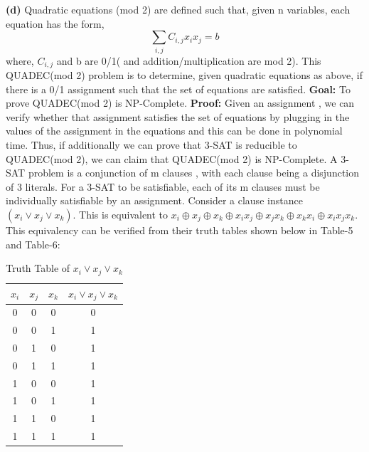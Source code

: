 \documentclass{article}
\renewcommand\part[1]{\vspace{.10in}\textbf{(#1)}}
\begin{document}
\part{d}
Quadratic equations (mod 2) are defined such that, given n variables, each equation has the form, \newline
\[ \sum_{i,j}C_{i,j}x_{i}x_{j} = b \]
where, $C_{i,j}$ and b are 0/1( and addition/multiplication are mod 2). This QUADEC(mod 2) problem is to determine, given quadratic equations as above, if there is a 0/1 assignment such that the set of equations are satisfied. \newline
\textbf {Goal:} To prove QUADEC(mod 2) is NP-Complete. \newline
\textbf{Proof:} Given an assignment , we can verify whether that assignment satisfies the set of equations by plugging in the values of the assignment in the equations and this can be done in polynomial time. Thus, if additionally we can prove that 3-SAT is reducible to QUADEC(mod 2), we can claim that QUADEC(mod 2) is NP-Complete. \newline
A 3-SAT problem is a conjunction of m clauses , with each clause being a disjunction of 3 literals. For a 3-SAT to be satisfiable, each of its m clauses must be individually satisfiable by an assignment. Consider a clause instance $(x_{i} \vee x_{j} \vee x_{k})$. This is equivalent to $x_{i}\oplus x_{j} \oplus x_{k} \oplus x_{i}x_{j} \oplus x_{j}x_{k} \oplus x_{k}x_{i} \oplus x_{i}x_{j}x_{k}$. This equivalency can be verified from their truth tables shown below in Table-5 and Table-6: \newline


\begin{table}[ht]
  \caption{Truth Table of $x_{i} \vee x_{j} \vee x_{k}$}
  \centering
  \begin{tabular}{c c c c}
  \hline\hline
  $x_{i}$ & $x_{j}$ & $x_{k}$ & $x_{i} \vee x_{j} \vee x_{k}$ \\[0.5ex]
  \hline
  0 & 0 & 0 & 0 \\
  0 & 0 & 1 & 1 \\
  0 & 1 & 0 & 1 \\
  0 & 1 & 1 & 1 \\
  1 & 0 & 0 & 1 \\
  1 & 0 & 1 & 1 \\
  1 & 1 & 0 & 1 \\
  1 & 1 & 1 & 1 \\ [0.5ex]  
  \end{tabular}
  \label{table:nonlin}
  \end{table}	  
\end{document}
